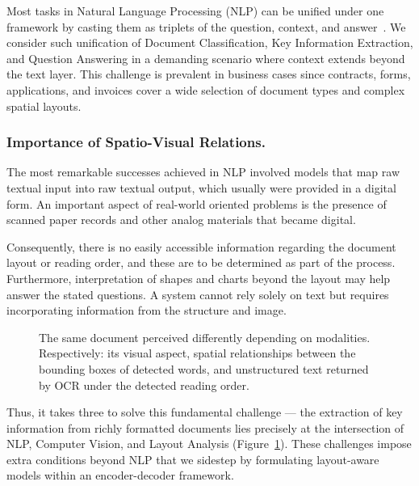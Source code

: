 \documentclass[runningheads]{llncs}
\begin{document}
Most tasks in Natural Language Processing (NLP) can be unified under one framework by casting them as triplets of the question, context, and answer~\cite{pmlr-v48-kumar16,DBLP:journals/corr/abs-1806-08730,khashabi2020unifiedqa}. We consider such unification of Document Classification, Key Information Extraction, and Question Answering in a demanding scenario where context extends beyond the text layer. This challenge is prevalent in business cases since contracts, forms, applications, and invoices cover a wide selection of document types and complex spatial layouts.




\subsubsection{Importance of Spatio-Visual Relations.}  
The most remarkable successes achieved in NLP involved models that map raw textual input into raw textual output, which usually were provided in a digital form.
An important aspect of real-world oriented problems is the presence of scanned paper records and other analog materials that became digital.

Consequently, there is no easily accessible information regarding the document layout or reading order, and these are to be determined as part of the process. Furthermore, interpretation of shapes and charts beyond the layout may help answer the stated questions. A system cannot rely solely on text but requires incorporating information from the structure and image.

\begin{figure}[htp]
\centering
{}\caption{The same document perceived differently depending on modalities. Respectively: its visual aspect, spatial relationships between the bounding boxes of detected words, and unstructured text returned by OCR under the detected reading order.
}
\label{fig:modalities}
\end{figure}

Thus, it takes three to solve this fundamental challenge --- the extraction of key information from richly formatted documents lies precisely at the intersection of NLP, Computer Vision, and Layout Analysis (Figure~\ref{fig:modalities}).
These challenges impose extra conditions beyond NLP that we sidestep by formulating layout-aware models within an encoder-decoder framework.
\end{document}
